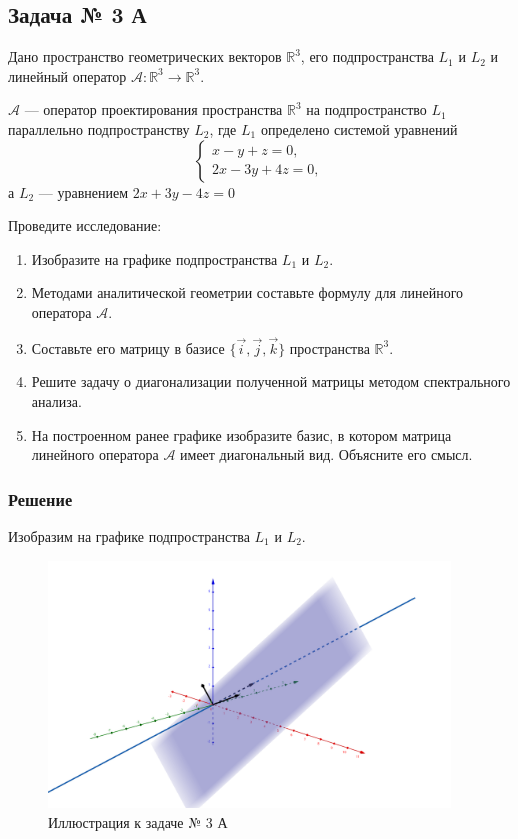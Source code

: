 \subsection{Задача № 3 А}

\newcommand{\mRRR}{\mathbb{R}^3}
\newcommand{\opA}{\mathcal{A}}
\newcommand{\matA}{\mathrm{A}}
\newcommand{\matP}{\mathrm{P}}


Дано пространство геометрических векторов \(\mRRR\),
его подпространства \(L_1\) и \(L_2\) и линейный оператор
\(\opA : \mRRR \to \mRRR\).

\(\opA\) --- оператор проектирования пространства \(\mRRR\)
на подпространство \(L_1\) параллельно подпространству \(L_2\),
где \(L_1\) определено системой уравнений
\[
  \begin{cases}
    x - y + z = 0, \\
    2x - 3y + 4z = 0,
  \end{cases}
\]
а \(L_2\) --- уравнением \(2x + 3y - 4z=0\)

Проведите исследование:
\begin{enumerate}
  \item Изобразите на графике подпространства \(L_1\) и \(L_2\).
  \item Методами аналитической геометрии составьте формулу
    для линейного оператора \(\opA\).
  \item Составьте его матрицу в базисе \(\{\vec{i}, \vec{j}, \vec{k}\}\)
    пространства \(\mRRR\).
  \item Решите задачу о диагонализации полученной матрицы
    методом спектрального анализа.
  \item На построенном ранее графике изобразите базис,
    в котором матрица линейного оператора \(\opA\) имеет диагональный вид.
    Объясните его смысл.
\end{enumerate}

\subsubsection{Решение}

Изобразим на графике подпространства \(L_1\) и \(L_2\).

\begin{figure}[!htbp]
  \centering
  \includegraphics[width=0.95\textwidth]{./img/03-a-1.png}
  \caption{Иллюстрация к задаче № 3 А}
\end{figure}

